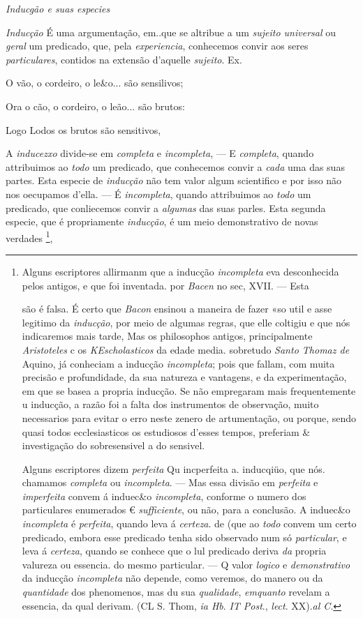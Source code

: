  \emph{Inducgão e suas especies}


\emph{Inducção} É uma argumentação, em..que se altribue a um \emph{sujeito universal} ou \emph{geral} um predicado, que, pela \emph{experiencia}, conhecemos convir aos seres \emph{particulares}, contidos na extensão d'aquelle \emph{sujeito}. Ex.

O vão, o cordeiro, o le\&o... são sensilivos;

Ora o cão, o cordeiro, o leão... são brutos:

Logo Lodos os brutos são sensitivos,


A \emph{inducezxo} divide-se em \emph{completa} e \emph{incompleta}, --- E \emph{completa}, quando attribuimos ao \emph{todo} um predicado, que conhecemos convir a \emph{cada} uma das suas partes. Esta especie de \emph{inducção} não tem valor algum scientifico e por isso não nos oecupamos d'ella. --- É \emph{incompleta}, quando attribuimos ao \emph{todo} um predicado, que conliecemos convir a \emph{algumas} das suas parles. Esta segunda especie, que é propriamente \emph{inducção}, é um meio demonstrativo de novas verdades \footnote{Alguns escriptores allirmanm que a inducção \emph{incompleta} eva desconhecida pelos antigos, e que foi inventada. por \emph{Bacen} no sec, XVII. --- Esta\par são é falsa. É certo que \emph{Bacon} ensinou a maneira de fazer «so util e asse legitimo da \emph{inducção}, por meio de algumas regras, que elle coltigiu e que nós indicaremos mais tarde, Mas os philosophos antigos, principalmente \emph{Aristoteles} c os \emph{KEscholasticos} da edade media. sobretudo \emph{Santo Thomaz de} Aquino, já conheciam a inducção \emph{incompleta}; pois que fallam, com muita precisão e profundidade, da sua natureza e vantagens, e da experimentação, em que se basea a propria inducção. Se não empregaram mais frequentemente u inducção, a razão foi a falta dos instrumentos de observação, muito necessarios para evitar o erro neste zenero de artumentação, ou porque, sendo quasi todos ecclesiasticos os estudiosos d'esses tempos, preferiam \& investigação do sobresensivel a do sensivel.\par Alguns escriptores dizem \emph{perfeita} Qu incperfeita a. inducqiüo, que nós. chamamos \emph{completa} ou \emph{incompleta}. --- Mas essa divisão em \emph{perfeita} e \emph{imperfeita} convem á induec\&o \emph{incompleta}, conforme o numero dos particulares enumerados € \emph{sufficiente}, ou não, para a conclusão. A induec\&o \emph{incompleta} é \emph{perfeita}, quando leva á \emph{certeza}. de (que ao \emph{todo} convem um certo predicado, embora esse predicado tenha sido observado num só \emph{particular}, e leva á \emph{certeza}, quando se conhece que o lul predicado deriva \emph{da} propria valureza ou essencia. do mesmo particular. --- Q valor \emph{logico} e \emph{demonstrativo} da inducção \emph{incompleta} não depende, como veremos, do manero ou da \emph{quantidade} dos phenomenos, mas du sua \emph{qualidade}, \emph{emquanto} revelam a essencia, da qual derivam. (CL S. Thom, \emph{ia Hb}. \emph{IT Post}., \emph{lect}. XX).\emph{al C}.},

